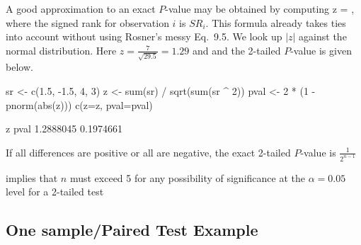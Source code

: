\item A good approximation to an exact $P$-value may be obtained by computing
\beq
z = ,
\eeq
where the signed rank for observation $i$ is $SR_{i}$.  This formula
already takes ties into account without using Rosner's messy Eq.\
9.5.  We look up $|z|$ against the normal distribution.  Here
$z=\frac{7}{\sqrt{29.5}}=1.29$ and and the 2-tailed $P$-value is given below.
\begin{Schunk}
\begin{Sinput}
sr <- c(1.5, -1.5, 4, 3)
z <- sum(sr) / sqrt(sum(sr ^ 2))
pval <- 2 * (1 - pnorm(abs(z)))
c(z=z, pval=pval)
\end{Sinput}
\begin{Soutput}
        z      pval 
1.2888045 0.1974661 
\end{Soutput}
\end{Schunk}
\item If all differences are positive or all are negative, the exact
  2-tailed $P$-value is $\frac{1}{2^{n-1}}$
 \bi
 \item implies that $n$ must exceed 5 for any possibility of
   significance at the $\alpha=0.05$ level for a 2-tailed test
 \ei
\ei

\subsection{One sample/Paired Test Example}

